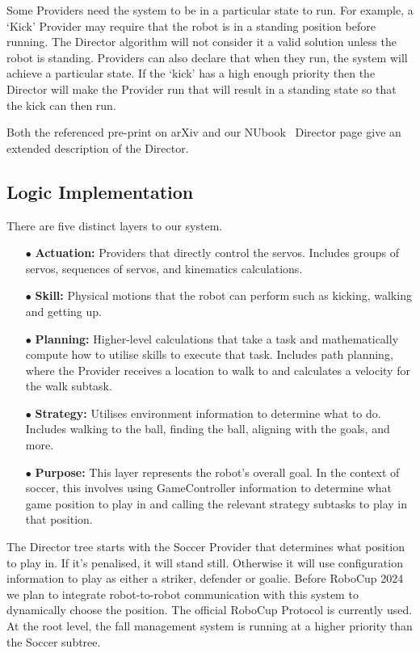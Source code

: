 \documentclass{llncs}
\begin{document}
Some Providers need the system to be in a particular state to run. For example, a `Kick' Provider may require that the robot is in a standing position before running. The Director algorithm will not consider it a valid solution unless the robot is standing. Providers can also declare that when they run, the system will achieve a particular state. If the `kick' has a high enough priority then the Director will make the Provider run that will result in a standing state so that the kick can then run.

Both the referenced pre-print on arXiv and our NUbook~\cite{nubotsNUbookGit} Director page give an extended description of the Director.

\subsection{Logic Implementation}

There are five distinct layers to our system.

\begin{itemize}
    \item[$\bullet$] \textbf{Actuation:} Providers that directly control the servos. Includes groups of servos, sequences of servos, and kinematics calculations.
    \item[$\bullet$] \textbf{Skill:} Physical motions that the robot can perform such as kicking, walking and getting up.
    \item[$\bullet$] \textbf{Planning:} Higher-level calculations that take a task and mathematically compute how to utilise skills to execute that task. Includes path planning, where the Provider receives a location to walk to and calculates a velocity for the walk subtask.
    \item[$\bullet$] \textbf{Strategy:} Utilises environment information to determine what to do. Includes walking to the ball, finding the ball, aligning with the goals, and more.
    \item[$\bullet$] \textbf{Purpose:} This layer represents the robot's overall goal. In the context of soccer, this involves using GameController information to determine what game position to play in and calling the relevant strategy subtasks to play in that position.
\end{itemize}

The Director tree starts with the Soccer Provider that determines what position to play in. If it's penalised, it will stand still. Otherwise it will use configuration information to play as either a striker, defender or goalie. Before RoboCup 2024 we plan to integrate robot-to-robot communication with this system to dynamically choose the position. The official RoboCup Protocol is currently used. At the root level, the fall management system is running at a higher priority than the Soccer subtree.
\end{document}
